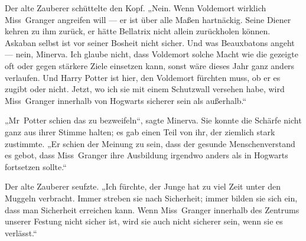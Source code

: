 Der alte Zauberer schüttelte den Kopf.
„Nein. Wenn Voldemort wirklich Miss~Granger angreifen will — er ist über alle Maßen hartnäckig. Seine Diener kehren zu ihm zurück, er hätte Bellatrix nicht allein zurückholen können. Askaban selbst ist vor seiner Bosheit nicht sicher. Und was Beauxbatons angeht — nein, Minerva. Ich glaube nicht, dass Voldemort solche Macht wie die gezeigte oft oder gegen stärkere Ziele einsetzen kann, sonst wäre dieses Jahr ganz anders verlaufen. Und Harry Potter ist hier, den Voldemort fürchten muss, ob er es zugibt oder nicht. Jetzt, wo ich sie mit einem Schutzwall versehen habe, wird Miss~Granger innerhalb von Hogwarts sicherer sein als außerhalb.“

„Mr~Potter schien das zu bezweifeln“, sagte Minerva. Sie konnte die Schärfe nicht ganz aus ihrer Stimme halten; es gab einen Teil von ihr, der ziemlich stark zustimmte.
„Er schien der Meinung zu sein, dass der gesunde Menschenverstand es gebot, dass Miss~Granger ihre Ausbildung irgendwo anders als in Hogwarts fortsetzen sollte.“

Der alte Zauberer seufzte.
„Ich fürchte, der Junge hat zu viel Zeit unter den Muggeln verbracht. Immer streben sie nach Sicherheit; immer bilden sie sich ein, dass man Sicherheit erreichen kann. Wenn Miss~Granger innerhalb des Zentrums unserer Festung nicht sicher ist, wird sie auch nicht sicherer sein, wenn sie es verlässt.“

